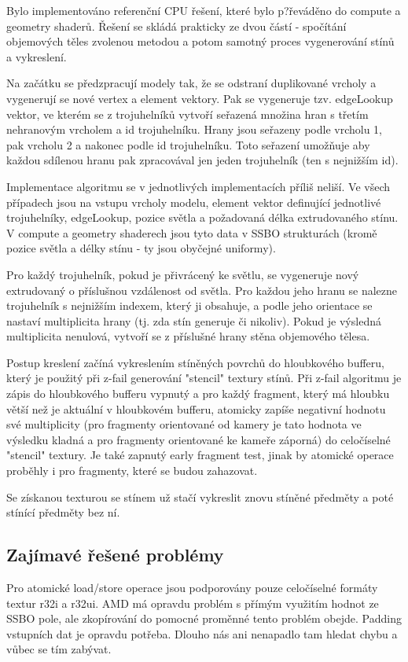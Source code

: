 \documentclass[a4paper, 12pt]{article}
\begin{document}
Bylo implementováno referenční CPU řešení, které bylo p?řeváděno do compute a geometry shaderů.
Řešení se skládá prakticky ze dvou částí - spočítání objemových těles zvolenou metodou a potom
samotný proces vygenerování stínů a vykreslení.

Na začátku se předzpracují modely tak, že se odstraní duplikované vrcholy a vygenerují se nové
vertex a element vektory. Pak se vygeneruje tzv. edgeLookup vektor, ve kterém se z trojuhelníků 
vytvoří seřazená množina hran s třetím nehranovým vrcholem a id trojuhelníku. Hrany jsou seřazeny
 podle vrcholu 1, pak vrcholu 2 a nakonec podle id trojuhelníku. Toto seřazení umožňuje aby každou 
sdílenou hranu pak zpracovával jen jeden trojuhelník (ten s nejnižším id).

Implementace algoritmu se v jednotlivých implementacích příliš neliší. Ve všech případech jsou na
vstupu vrcholy modelu, element vektor definující jednotlivé trojuhelníky, edgeLookup, pozice světla a 
požadovaná délka extrudovaného stínu. V compute a geometry shaderech jsou tyto data v SSBO strukturách
(kromě pozice světla a délky stínu - ty jsou obyčejné uniformy).
 
Pro každý trojuhelník, pokud je přivrácený ke světlu, se vygeneruje nový extrudovaný o příslušnou vzdálenost
od světla. Pro každou jeho hranu se nalezne trojuhelník s nejnižším indexem, který ji obsahuje, a podle
jeho orientace se nastaví multiplicita hrany (tj. zda stín generuje či nikoliv).
Pokud je výsledná multiplicita nenulová, vytvoří se z příslušné hrany stěna objemového tělesa.



Postup kreslení začíná vykreslením stíněných povrchů do hloubkového bufferu, který je použitý při 
z-fail generování "stencil" textury stínů. Při z-fail algoritmu je zápis do hloubkového bufferu vypnutý
a pro každý fragment, který má hloubku větší než je aktuální v hloubkovém bufferu, atomicky zapíše negativní
hodnotu své multiplicity (pro fragmenty orientované od kamery je tato hodnota ve výsledku kladná a pro
fragmenty orientované ke kameře záporná) do celočíselné "stencil" textury. Je také zapnutý early fragment test,
jinak by atomické operace proběhly i pro fragmenty, které se budou zahazovat.

Se získanou texturou se stínem už stačí vykreslit znovu stíněné předměty a poté stínící předměty bez ní.

\subsection{Zajímavé řešené problémy}
Pro atomické load/store operace jsou podporovány pouze celočíselné formáty textur r32i a r32ui.
AMD má opravdu problém s přímým využitím hodnot ze SSBO pole, ale zkopírování do pomocné proměnné tento problém obejde.
Padding vstupních dat je opravdu potřeba. Dlouho nás ani nenapadlo tam hledat chybu a vůbec se tím zabývat. 
\end{document}
